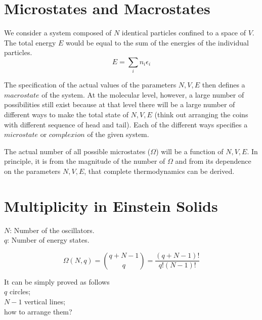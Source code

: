 

\section{Microstates and Macrostates}
We consider a system composed of $N$ identical particles confined to a space of $V$.
The total energy $E$ would be equal to the sum of the energies of the individual particles.
\begin{equation} E = \sum_i n_i\epsilon_i \end{equation}

The specification of the actual values of the parameters $N, V, E$ then defines a $macrostate$ of the system.
At the molecular level, however, a large number of possibilities still exist because at that level there will be a large number of different ways to make the total state of $N,V,E$ (think out arranging the coins with different sequence of head and tail).
Each of the different ways specifies a $microstate$ or $complexion$ of the given system.

The actual number of all possible microstates ($\Omega$) will be a function of $N, V, E$. In principle, it is from the magnitude of the number of $\Omega$ and from its dependence on the parameters $N, V, E$, that complete thermodynamics can be derived.


\section{Multiplicity in Einstein Solids}
$N$: Number of the oscillators.\\
$q$: Number of energy states.

\begin{equation}
 \Omega(N, q) = \binom{q+N-1}{q} = \frac{(q+N-1)!}{q!(N-1)!}
\end{equation}

It can be simply proved as follows\\
$q$ circles; \\
$N-1$ vertical lines;\\
how to arrange them? \\

